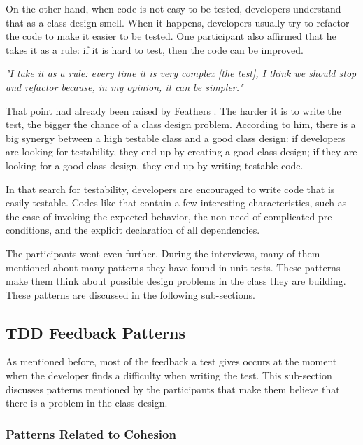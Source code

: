 \documentclass[times]{speauth}
\begin{document}
On the other hand, when code is not easy to be tested, developers understand that
as a class design smell. When it happens, developers usually try to refactor
the code to make it easier to be tested. One participant also affirmed that he
takes it as a rule: if it is hard to test, then the code can be improved.

\begin{framed}
	\textit{"I take it as a rule: every time it is very complex [the test],
	I think we should stop and refactor because, in my opinion, it can be simpler."}	
\end{framed}

That point had already been raised by Feathers \cite{feathers-synergy}.
The harder it is to write the test, the bigger the chance of a class design problem.
According to him, there is a big synergy between a high testable class and
a good class design: if developers are looking for testability, they end up by
creating a good class design; if they are looking for a good class design, they end
up by writing testable code.

In that search for testability, developers are encouraged to write code
that is easily testable. Codes like that contain a few interesting
characteristics, such as the ease of invoking the expected behavior,
the non need of complicated pre-conditions, and the explicit declaration
of all dependencies.

The participants went even further. During the interviews, many of them
mentioned about many patterns they have found in unit tests. These patterns
make them think about possible design problems in the class they are building.
These patterns are discussed in the following sub-sections.

\subsection{TDD Feedback Patterns}
\label{padroes-tdd}

As mentioned before, most of the feedback a test gives occurs at the moment
when the developer finds a difficulty when writing the test. This sub-section discusses
patterns mentioned by the participants that make them believe that there is a
problem in the class design.

\subsubsection{Patterns Related to Cohesion}
\end{document}
